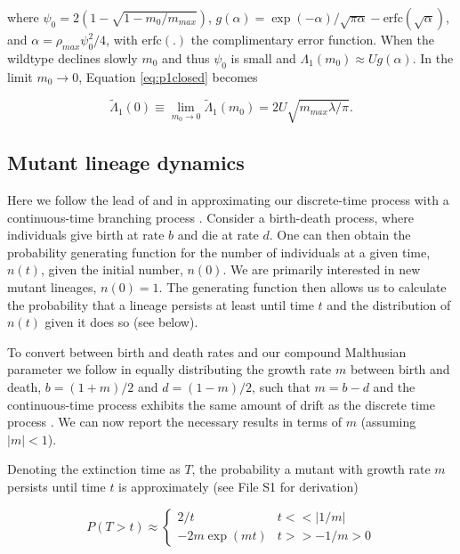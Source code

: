 \documentclass[9pt,twocolumn,twoside,lineno]{gsajnl}
\begin{document}
\noindent where $\psi_0 = 2(1-\sqrt{1-m_0/m_{max}})$, $g(\alpha) = \exp(-\alpha)/\sqrt{\pi \alpha} - \mathrm{erfc}(\sqrt{\alpha})$, and $\alpha=\rho_{max} \psi_0^2/4$, with $\mathrm{erfc}(.)$ the complimentary error function.
When the wildtype declines slowly $m_0$ and thus $\psi_0$ is small and $\Lambda_1(m_0)\approx U g(\alpha)$.
In the limit $m_0\rightarrow0$, Equation \ref{eq:p1closed} becomes

\begin{equation}\label{eq:Lambda0}
\tilde{\Lambda}_1(0) \equiv \lim_{m_0\rightarrow0} \tilde{\Lambda}_1(m_0) = 2 U \sqrt{m_{max}\lambda/\pi}.
\end{equation} 

\subsection{Mutant lineage dynamics}
\label{subsec:mutants}

Here we follow the lead of \cite{Weissman2010} and \cite{Uecker2016} in approximating our discrete-time process with a continuous-time branching process \citep[see chapter 6 in][]{Allen2010}. 
Consider a birth-death process, where individuals give birth at rate $b$ and die at rate $d$. 
One can then obtain the probability generating function for the number of individuals at a given time, $n(t)$, given the initial number, $n(0)$.
We are primarily interested in new mutant lineages, $n(0)=1$.
The generating function then allows us to calculate the probability that a lineage persists at least until time $t$ and the distribution of $n(t)$ given it does so (see below).

To convert between birth and death rates and our compound Malthusian parameter we follow \cite{Uecker2016} in equally distributing the growth rate $m$ between birth and death, $b = (1+m)/2$ and $d=(1-m)/2$, such that $m=b-d$ and the continuous-time process exhibits the same amount of drift as the discrete time process \citep[and matches discrete-time simulations well;][]{Uecker2014}.
We can now report the necessary results in terms of $m$ (assuming $|m|<1$).

Denoting the extinction time as $T$, the probability a mutant with growth rate $m$ persists until time $t$ is approximately (see File S1 for derivation)

\begin{equation}\label{eq:pT}
P( T > t ) \approx 
\begin{cases}
	2 / t & t << |1/m| \\
	-2 m \exp(m t) & t >> -1/m > 0
\end{cases}
\end{equation}
\end{document}

